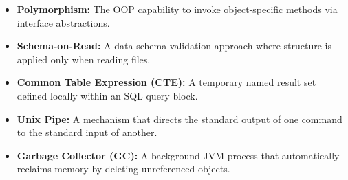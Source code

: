 \documentclass[12pt,a4paper]{article}
\begin{document}
\begin{tcolorbox}[defbox, title={\textbf{One-Line Definitions}}]
\begin{itemize}[leftmargin=*, itemsep=3pt, topsep=0pt]
  \item \textbf{Polymorphism:} The OOP capability to invoke object-specific methods via interface abstractions.
  \item \textbf{Schema-on-Read:} A data schema validation approach where structure is applied only when reading files.
  \item \textbf{Common Table Expression (CTE):} A temporary named result set defined locally within an SQL query block.
  \item \textbf{Unix Pipe:} A mechanism that directs the standard output of one command to the standard input of another.
  \item \textbf{Garbage Collector (GC):} A background JVM process that automatically reclaims memory by deleting unreferenced objects.
\end{itemize}
\end{tcolorbox}

\vspace{6pt}
\end{document}
